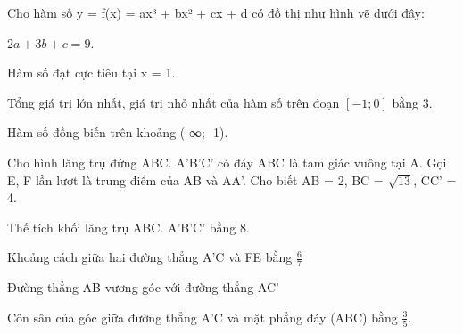 \begin{question}[type=true_false,difficulty=3,code={II-1}]
Cho hàm số y = f(x) = ax³ + bx² + cx + d có đồ thị như hình vẽ dưới đây:



\begin{statement}[correct=false,label=a]
$ 2a + 3b + c = 9 $.
\end{statement}

\begin{statement}[correct=false,label=b]
Hàm số đạt cực tiêu tại x = 1.
\end{statement}

\begin{statement}[correct=true,label=c]
Tổng giá trị lớn nhất, giá trị nhỏ nhất của hàm số trên đoạn $ [-1;0] $ bằng 3.
\end{statement}

\begin{statement}[correct=false,label=d]
Hàm số đồng biến trên khoảng (-∞; -1).
\end{statement}

\end{question}

\begin{question}[type=true_false,difficulty=3,code={II-2}]
Cho hình lăng trụ đứng ABC. A'B'C' có đáy ABC là tam giác vuông tại A. Gọi E, F lần lượt là trung điểm của AB và AA'. Cho biết AB = 2, BC = $ \sqrt{13} $, CC' = 4.

\begin{statement}[correct=false,label=a]
Thế tích khối lăng trụ ABC. A'B'C' bằng 8.
\end{statement}

\begin{statement}[correct=false,label=b]
Khoảng cách giữa hai đường thẳng A'C và FE bằng $ \frac{6}{7} $
\end{statement}

\begin{statement}[correct=true,label=c]
Đường thẳng AB vương góc với đường thẳng AC'
\end{statement}

\begin{statement}[correct=true,label=d]
Côn sân của góc giữa đường thẳng A'C và mặt phẳng đáy (ABC) bằng $ \frac{3}{5} $.
\end{statement}

\end{question}

